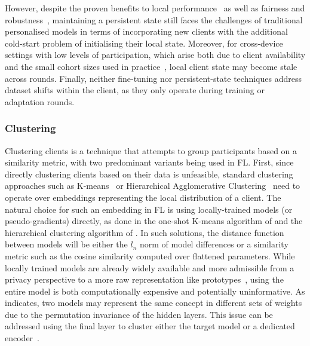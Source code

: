 However, despite the proven benefits to local performance~\citep{FlWithPersonalisationLayers,AdaptivePersonalisedFederatedLearning} as well as fairness and robustness~\citep{Ditto}, maintaining a persistent state still faces the challenges of traditional personalised models in terms of incorporating new clients with the additional cold-start problem of initialising their local state. Moreover, for cross-device settings with low levels of participation, which arise both due to client availability and the small cohort sizes used in practice~\citep{ScaleSystemDesign,LargeCohorts}, local client state may become stale across rounds. Finally, neither fine-tuning nor persistent-state techniques address dataset shifts within the client, as they only operate during training or adaptation rounds.

\subsubsection{Clustering}

Clustering clients is a technique that attempts to group participants based on a similarity metric, with two predominant variants being used in FL.  First, since directly clustering clients based on their data is unfeasible, standard clustering approaches such as K-means~\citep{K-means} or Hierarchical Agglomerative Clustering~\citep{OgHierClustering} need to operate over embeddings representing the local distribution of a client. The natural choice for such an embedding in FL is using locally-trained models (or pseudo-gradients) directly, as done in the one-shot K-means algorithm of \citet{AnEfficientFrameworkForClusteredFL} and the hierarchical clustering algorithm of \citet{HierClustering}. In such solutions, the distance function between models will be either the $l_n$ norm of model differences or a similarity metric such as the cosine similarity computed over flattened parameters. While locally trained models are already widely available and more admissible from a privacy perspective to a more raw representation like prototypes~\citep{FedProto}, using the entire model is both computationally expensive and potentially uninformative. As \citet{FedMA} indicates, two models may represent the same concept in different sets of weights due to the permutation invariance of the hidden layers. This issue can be addressed using the final layer to cluster either the target model or a dedicated encoder~\citep{CommunityBasedFL}.

